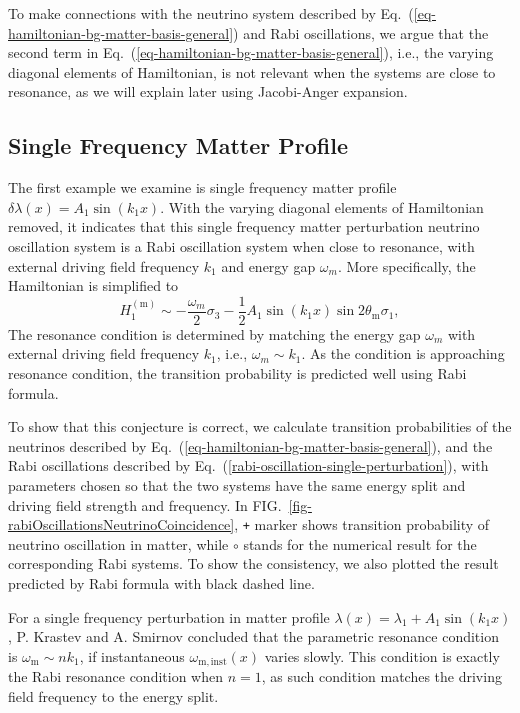 \documentclass[%
reprint,
 amsmath,amssymb,
 aps,
]{revtex4-1}
\begin{document}
To make connections with the neutrino system described by Eq.~(\ref{eq-hamiltonian-bg-matter-basis-general}) and Rabi oscillations, we argue that the second term in Eq.~(\ref{eq-hamiltonian-bg-matter-basis-general}), i.e., the varying diagonal elements of Hamiltonian, is not relevant when the systems are close to resonance, as we will explain later using Jacobi-Anger expansion. 


\subsection{\label{sec:single-freq}Single Frequency Matter Profile}

The first example we examine is single frequency matter profile $\delta\lambda(x) = A_1 \sin(k_1 x)$. With the varying diagonal elements of Hamiltonian removed, it indicates that this single frequency matter perturbation neutrino oscillation system is a Rabi oscillation system when close to resonance, with external driving field frequency $k_1$ and energy gap $\omega_m$. More specifically, the Hamiltonian is simplified to
\begin{equation}
H^{(\mathrm{m})}_1 \sim -\frac{\omega_m}{2} \sigma_3  -\frac{1}{2}A_1 \sin(k_1 x) \sin 2\theta_{\mathrm m} \sigma_1,
    \label{eq-hamiltonian-bg-matter-basis-single-frequency}
\end{equation}
The resonance condition is determined by matching the energy gap $\omega_m$ with external driving field frequency $k_1$, i.e., $\omega_m \sim k_1$. As the condition is approaching resonance condition, the transition probability is predicted well using Rabi formula.

To show that this conjecture is correct, we calculate transition probabilities of the neutrinos described by Eq.~(\ref{eq-hamiltonian-bg-matter-basis-general}), and the Rabi oscillations described by Eq.~(\ref{rabi-oscillation-single-perturbation}), with parameters chosen so that the two systems have the same energy split and driving field strength and frequency. In FIG.~\ref{fig-rabiOscillationsNeutrinoCoincidence}, \verb|+| marker shows transition probability of neutrino oscillation in matter, while $\circ$ stands for the numerical result for the corresponding Rabi systems. To show the consistency, we also plotted the result predicted by Rabi formula with black dashed line.

For a single frequency perturbation in matter profile $\lambda(x) =\lambda_1 +  A_1\sin(k_1 x)$, P. Krastev and A. Smirnov concluded that the parametric resonance condition is $\omega_{\mathrm{m}} \sim n k_1$, if instantaneous $\omega_{\mathrm{m,inst}}(x)$ varies slowly.\cite{Krastev1989} This condition is exactly the Rabi resonance condition when $n=1$, as such condition matches the driving field frequency to the energy split.
\end{document}
